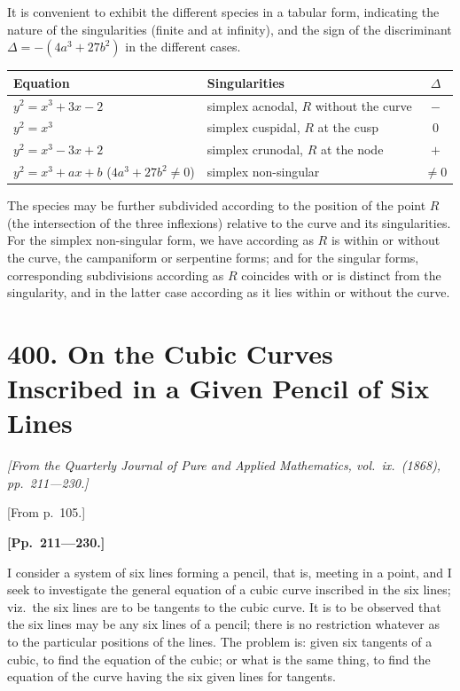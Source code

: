 \documentclass[11pt,a4paper]{article}
\theoremstyle{definition}
\begin{document}
It is convenient to exhibit the different species in a tabular form, indicating the nature of the singularities (finite and at infinity), and the sign of the discriminant $\Delta = -(4a^3 + 27b^2)$ in the different cases.

\begin{center}
\begin{tabular}{llc}
\toprule
\textbf{Equation} & \textbf{Singularities} & $\Delta$\\
\midrule
$y^2 = x^3 + 3x - 2$ & simplex acnodal, $R$ without the curve & $-$\\
$y^2 = x^3$ & simplex cuspidal, $R$ at the cusp & $0$\\
$y^2 = x^3 - 3x + 2$ & simplex crunodal, $R$ at the node & $+$\\
$y^2 = x^3 + ax + b$ ($4a^3+27b^2 \neq 0$) & simplex non-singular & $\neq 0$\\
\bottomrule
\end{tabular}
\end{center}

The species may be further subdivided according to the position of the point $R$ (the intersection of the three inflexions) relative to the curve and its singularities. For the simplex non-singular form, we have according as $R$ is within or without the curve, the campaniform or serpentine forms; and for the singular forms, corresponding subdivisions according as $R$ coincides with or is distinct from the singularity, and in the latter case according as it lies within or without the curve.

\newpage


\section*{400. On the Cubic Curves Inscribed in a Given Pencil of Six Lines}

\begin{flushright}
\textit{[From the Quarterly Journal of Pure and Applied Mathematics, vol.\ ix.\ (1868), pp.~211---230.]}
\end{flushright}

\vspace{0.5em}

[From p.~105.]

\bigskip

\noindent\textbf{[Pp.~211---230.]}

I consider a system of six lines forming a pencil, that is, meeting in a point, and I seek to investigate the general equation of a cubic curve inscribed in the six lines; viz.\ the six lines are to be tangents to the cubic curve. It is to be observed that the six lines may be any six lines of a pencil; there is no restriction whatever as to the particular positions of the lines. The problem is: given six tangents of a cubic, to find the equation of the cubic; or what is the same thing, to find the equation of the curve having the six given lines for tangents.
\end{document}
